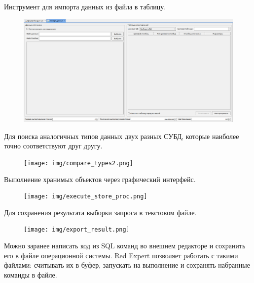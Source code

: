 Инструмент для импорта данных из файла в таблицу.

\begin{figure}[H]
	\centering
	\includegraphics[width = 0.95\linewidth]{img/ImportData.png}
\end{figure}


Для поиска аналогичных типов данных двух разных СУБД, которые наиболее точно соответствуют друг другу.
	\begin{figure}[H]
		\centering
		\texttt{[image: img/compare\_types2.png]}
	\end{figure}


Выполнение хранимых объектов через графический интерфейс.
	\begin{figure}[H]
		\centering
		\texttt{[image: img/execute\_store\_proc.png]}
	\end{figure}
	

Для сохранения результата выборки  запроса в текстовом файле.
	\begin{figure}[H]
		\centering
		\texttt{[image: img/export\_result.png]}
	\end{figure}

Можно заранее написать код из SQL команд во внешнем редакторе и сохранить его в файле операционной системы. Red Expert позволяет работать с такими файлами: считывать их в буфер, запускать на выполнение и сохранять набранные команды в файле.

